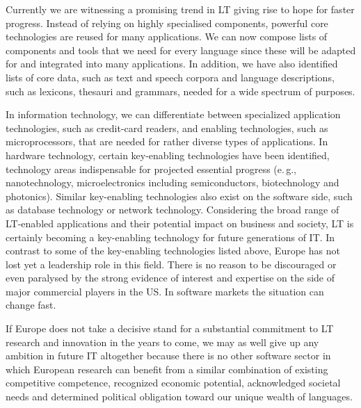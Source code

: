 \documentclass[10pt, plain]{../../metanetpaper}
\begin{document}
\begin{multicols}{2}
Currently we are witnessing a promising trend in LT giving rise to hope for faster progress. Instead of relying on highly specialised components, powerful core technologies are reused for many applications. We can now compose lists of components and tools that we need for every language since these will be adapted for and integrated into many applications. In addition, we have also identified lists of core data, such as text and speech corpora and language descriptions, such as lexicons, thesauri and grammars, needed for a wide spectrum of purposes.
 
In information technology, we can differentiate between specialized application technologies, such as credit-card readers, and enabling technologies, such as microprocessors, that are needed for rather diverse types of applications. In hardware technology, certain key-enabling technologies have been identified, technology areas indispensable for projected essential progress (e.\,g., nanotechnology, microelectronics including semiconductors, biotechnology and photonics). Similar key-enabling technologies also exist on the software side, such as database technology or network technology. Considering the broad range of LT-enabled applications and their potential impact on business and society, LT is certainly becoming a key-enabling technology for future generations of IT. In contrast to some of the key-enabling technologies listed above, Europe has not lost yet a leadership role in this field. There is no reason to be discouraged or even paralysed by the strong evidence of interest and expertise on the side of major commercial players in the US. In software markets the situation can change fast.
 
If Europe does not take a decisive stand for a substantial commitment to LT research and innovation in the years to come, we may as well give up any ambition in future IT altogether because there is no other software sector in which European research can benefit from a similar combination of existing competitive competence, recognized economic potential, acknowledged societal needs and determined political obligation toward our unique wealth of languages.
\end{multicols}

\clearpage



\label{sec:pts}
\end{document}
